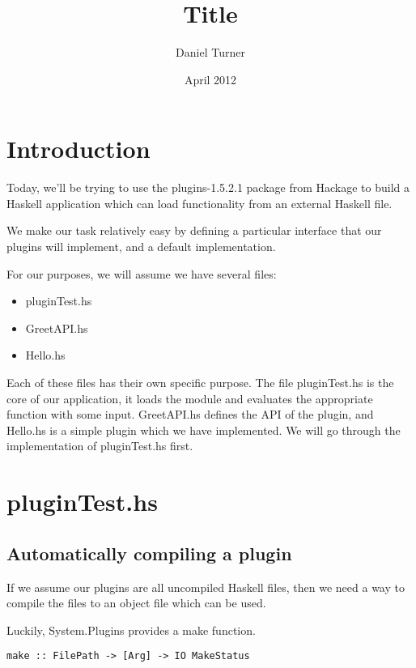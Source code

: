 \documentclass{article}
\begin{document}
\lstset{language=Haskell}

\title{Title}
\author{Daniel Turner}
\date{April 2012}
\maketitle

\section{Introduction}

Today, we'll be trying to use the plugins-1.5.2.1 package from Hackage to build a Haskell application which can load functionality from an external Haskell file.

We make our task relatively easy by defining a particular interface that our plugins will implement, and a default implementation.

For our purposes, we will assume we have several files:

\begin{itemize}
  \item pluginTest.hs
  \item GreetAPI.hs
  \item Hello.hs
\end{itemize}

Each of these files has their own specific purpose. The file pluginTest.hs is the core of our application, it loads the module and evaluates the appropriate function with some input. GreetAPI.hs defines the API of the plugin, and Hello.hs is a simple plugin which we have implemented. We will go through the implementation of pluginTest.hs first.

\section{pluginTest.hs}
\subsection{Automatically compiling a plugin}

If we assume our plugins are all uncompiled Haskell files, then we need a way to compile the files to an object file which can be used.

Luckily, System.Plugins provides a make function.

\begin{lstlisting}
make :: FilePath -> [Arg] -> IO MakeStatus
\end{lstlisting} 
\end{document}
